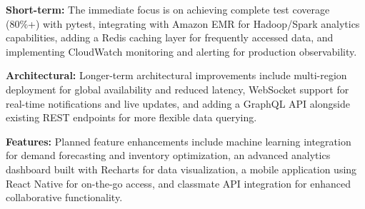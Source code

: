 \documentclass[conference]{IEEEtran}
\begin{document}
\textbf{Short-term:} The immediate focus is on achieving complete test coverage (80\%+) with pytest, integrating with Amazon EMR for Hadoop/Spark analytics capabilities, adding a Redis caching layer for frequently accessed data, and implementing CloudWatch monitoring and alerting for production observability.

\textbf{Architectural:} Longer-term architectural improvements include multi-region deployment for global availability and reduced latency, WebSocket support for real-time notifications and live updates, and adding a GraphQL API alongside existing REST endpoints for more flexible data querying.

\textbf{Features:} Planned feature enhancements include machine learning integration for demand forecasting and inventory optimization, an advanced analytics dashboard built with Recharts for data visualization, a mobile application using React Native for on-the-go access, and classmate API integration for enhanced collaborative functionality.

\end{document}
